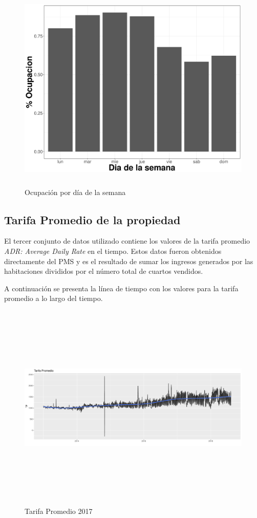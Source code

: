 \begin{figure}[H]
  \centering
      \includegraphics[width=\maxwidth,height=10cm]{Figures/Ocupacion_Dia_Semana-1}   
  \caption{Ocupación por día de la semana}
\end{figure}



\subsection*{Tarifa Promedio de la propiedad}

El tercer conjunto de datos utilizado contiene los valores de la tarifa promedio \emph{ADR: Average Daily Rate} en el tiempo. Estos datos fueron obtenidos directamente del PMS y es el resultado de sumar los ingresos generados por las habitaciones divididos por el número total de cuartos vendidos. 

A continuación se presenta la línea de tiempo con los valores para la tarifa promedio a lo largo del tiempo.

\begin{figure}[H]
  \centering
      \includegraphics[width=\maxwidth,height=10cm]{figures/IndicadoresTarifaPromedio-1}    
  \caption{Tarifa Promedio 2017}
\end{figure}


